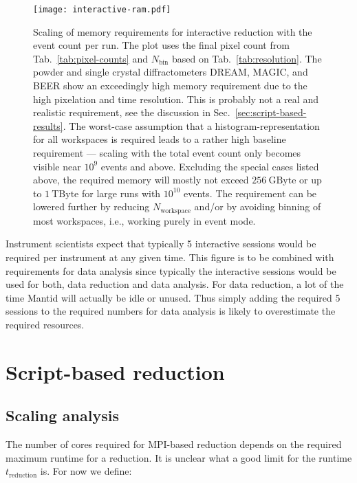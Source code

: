 \documentclass[a4paper,english,numbers=noenddot,bibliography=totoc,chapterprefix=on,DIV=12]{scrartcl}
\newcommand{\Treduction}{t_{\text{reduction}}}
\newcommand{\Nbin}{N_{\text{bin}}}
\newcommand{\Nworkspace}{N_{\text{workspace}}}
\newcommand{\beer}{BEER\xspace}
\newcommand{\dream}{DREAM\xspace}
\newcommand{\magic}{MAGIC\xspace}
\newcommand{\mantid}{Mantid\xspace}
\begin{document}
\begin{figure}
  \centering
\texttt{[image: interactive-ram.pdf]}
\caption{\label{fig:interactive-ram}
Scaling of memory requirements for interactive reduction with the event count per run.
The plot uses the final pixel count from Tab.~\ref{tab:pixel-counts} and $\Nbin$ based on Tab.~\ref{tab:resolution}.
The powder and single crystal diffractometers \dream, \magic, and \beer show an exceedingly high memory requirement due to the high pixelation and time resolution.
This is probably not a real and realistic requirement, see the discussion in Sec.~\ref{sec:script-based-results}.
The worst-case assumption that a histogram-representation for all workspaces is required leads to a rather high baseline requirement --- scaling with the total event count only becomes visible near $10^9$ events and above.
Excluding the special cases listed above, the required memory will mostly not exceed $256~\mathrm{GByte}$ or up to $1~\mathrm{TByte}$ for large runs with $10^{10}$ events.
The requirement can be lowered further by reducing $\Nworkspace$ and/or by avoiding binning of most workspaces, i.e., working purely in event mode.
}
\end{figure}

Instrument scientists expect that typically 5 interactive sessions would be required per instrument at any given time.
This figure is to be combined with requirements for data analysis since typically the interactive sessions would be used for both, data reduction and data analysis.
For data reduction, a lot of the time \mantid will actually be idle or unused.
Thus simply adding the required 5 sessions to the required numbers for data analysis is likely to overestimate the required resources.




\section{Script-based reduction}


\subsection{Scaling analysis}
\label{sec:scaling-analysis}

The number of cores required for MPI-based reduction depends on the required maximum runtime for a reduction.
It is unclear what a good limit for the runtime $\Treduction$ is.
For now we define:
\end{document}
